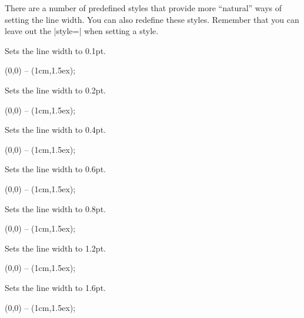 There are a number of predefined styles that provide more ``natural''
ways of setting the line width. You can also redefine these
styles. Remember that you can leave out the |style=| when setting a
style.

\begin{itemize}
  Sets the line width to 0.1pt.
\begin{codeexample}[]
  \tikz {} (0,0) -- (1cm,1.5ex);
\end{codeexample}

  Sets the line width to 0.2pt.
\begin{codeexample}[]
  \tikz {} (0,0) -- (1cm,1.5ex);
\end{codeexample}

  Sets the line width to 0.4pt.
\begin{codeexample}[]
  \tikz \draw[thin] (0,0) -- (1cm,1.5ex);
\end{codeexample}

  Sets the line width to 0.6pt.
\begin{codeexample}[]
  \tikz \draw[semithick] (0,0) -- (1cm,1.5ex);
\end{codeexample}

  Sets the line width to 0.8pt.
\begin{codeexample}[]
  \tikz \draw[thick] (0,0) -- (1cm,1.5ex);
\end{codeexample}

  Sets the line width to 1.2pt.
\begin{codeexample}[]
  \tikz {} (0,0) -- (1cm,1.5ex);
\end{codeexample}

  Sets the line width to 1.6pt.
\begin{codeexample}[]
  \tikz {} (0,0) -- (1cm,1.5ex);
\end{codeexample}
\end{itemize}

